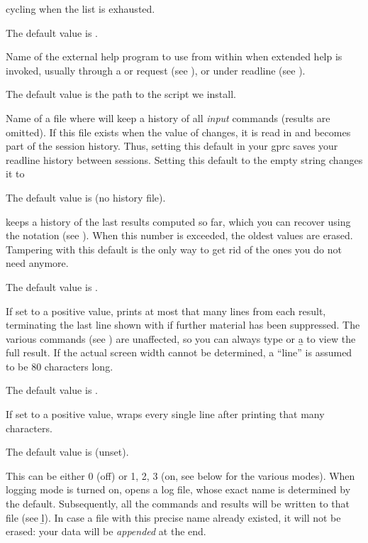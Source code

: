 {cycling when the  list is exhausted.

The default value is \kbd{[4,5]}.

\label{se:def,help}
Name of the external help program to use from within  when
extended help is invoked, usually through a  or  request
(see ), or  under readline (see
).

The default value is the path to the  script we install.

\label{se:def,histfile}
Name of a file where
 will keep a history of all \emph{input} commands (results are
omitted). If this file exists when the value of  changes,
it is read in and becomes part of the session history. Thus, setting this
default in your gprc saves your readline history between sessions. Setting
this default to the empty string  changes it to

The default value is  (no history file).

\label{se:def,histsize}
 keeps a history of the last
 results computed so far, which you can recover using the
\kbd{\%} notation (see ). When this number is exceeded,
the oldest values are erased. Tampering with this default is the only way to
get rid of the ones you do not need anymore.

The default value is .

\label{se:def,lines}
If set to a positive value,  prints at
most that many lines from each result, terminating the last line shown with
\kbd{[+++]} if further material has been suppressed. The various 
commands (see ) are unaffected, so you can always type
 or \b{a} to view the full result. If the actual screen width
cannot be determined, a ``line'' is assumed to be 80 characters long.

The default value is .

\label{se:def,linewrap}
If set to a positive value,  wraps every single line after
printing that many characters.

The default value is  (unset).

\label{se:def,log}
This can be either 0 (off) or 1, 2, 3
(on, see below for the various modes). When logging mode is turned on, 
opens a log file, whose exact name is determined by the 
default. Subsequently, all the commands and results will be written to that
file (see \b{l}). In case a file with this precise name already existed, it
will not be erased: your data will be \emph{appended} at the end.

}
